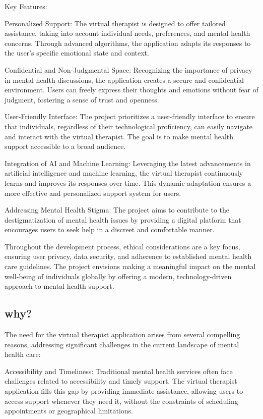 Key Features:

    Personalized Support: The virtual therapist is designed to offer tailored assistance, taking into account individual needs, preferences, and mental health concerns. Through advanced algorithms, the application adapts its responses to the user's specific emotional state and context.

    Confidential and Non-Judgmental Space: Recognizing the importance of privacy in mental health discussions, the application creates a secure and confidential environment. Users can freely express their thoughts and emotions without fear of judgment, fostering a sense of trust and openness.

    User-Friendly Interface: The project prioritizes a user-friendly interface to ensure that individuals, regardless of their technological proficiency, can easily navigate and interact with the virtual therapist. The goal is to make mental health support accessible to a broad audience.

    Integration of AI and Machine Learning: Leveraging the latest advancements in artificial intelligence and machine learning, the virtual therapist continuously learns and improves its responses over time. This dynamic adaptation ensures a more effective and personalized support system for users.

    Addressing Mental Health Stigma: The project aims to contribute to the destigmatization of mental health issues by providing a digital platform that encourages users to seek help in a discreet and comfortable manner.

Throughout the development process, ethical considerations are a key focus, ensuring user privacy, data security, and adherence to established mental health care guidelines. The project envisions making a meaningful impact on the mental well-being of individuals globally by offering a modern, technology-driven approach to mental health support.
 
\subsection{why?} %
The need for the virtual therapist application arises from several compelling reasons, addressing significant challenges in the current landscape of mental health care:

    Accessibility and Timeliness: Traditional mental health services often face challenges related to accessibility and timely support. The virtual therapist application fills this gap by providing immediate assistance, allowing users to access support whenever they need it, without the constraints of scheduling appointments or geographical limitations.


